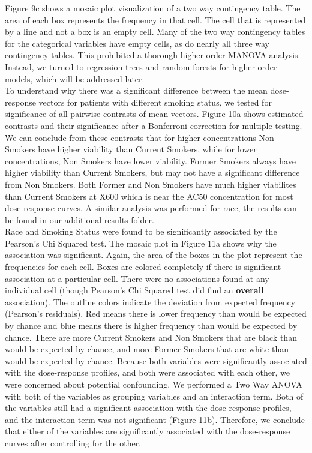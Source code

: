 \documentclass[12pt]{article}
\begin{document}
Figure 9c shows a mosaic plot visualization of a two way contingency table.  The area of each box represents the frequency in that cell.  The cell that is represented by a line and not a box is an empty cell.  Many of the two way contingency tables for the categorical variables have empty cells, as do nearly all three way contingency tables.  This prohibited a thorough higher order MANOVA analysis. Instead, we turned to regression trees and random forests for higher order models, which will be addressed later.\\

To understand why there was a significant difference between the mean dose-response vectors for patients with different smoking status, we tested for significance of all pairwise contrasts of mean vectors.  Figure 10a shows estimated contrasts and their significance after a Bonferroni correction for multiple testing.  We can conclude from these contrasts that for higher concentrations Non Smokers have higher viability than Current Smokers, while for lower concentrations, Non Smokers have lower viability.  Former Smokers always have higher viability than Current Smokers, but may not have a significant difference from Non Smokers. Both Former and Non Smokers have much higher viabilites than Current Smokers at X600 which is near the AC50 concentration for most dose-response curves.  A similar analysis was performed for race, the results can be found in our additional results folder. \\ 

Race and Smoking Status were found to be significantly associated by the Pearson's Chi Squared test. The mosaic plot in Figure 11a shows why the association was significant.  Again, the area of the boxes in the plot represent the frequencies for each cell.  Boxes are colored completely if there is significant association at a particular cell.  There were no associations found at any individual cell (though Pearson's Chi Squared test did find an \textbf{overall} association).  The outline colors indicate the deviation from expected frequency (Pearson's residuals).  Red means there is lower frequency than would be expected by chance and blue means there is higher frequency than would be expected by chance.  There are more Current Smokers and Non Smokers that are black than would be expected by chance, and more Former Smokers that are white than would be expected by chance.  Because both variables were significantly associated with the dose-response profiles, and both were associated with each other, we were concerned about potential confounding.  We performed a Two Way ANOVA with both of the variables as grouping variables and an interaction term.  Both of the variables still had a significant association with the dose-response profiles, and the interaction term was not significant (Figure 11b).  Therefore, we conclude that either of the variables are significantly associated with the dose-response curves after controlling for the other.
\end{document}
